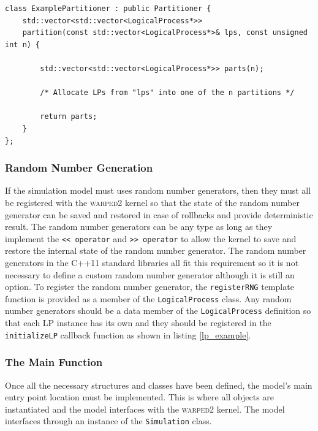 \documentclass[11pt]{book}
\begin{document}
\begin{lstlisting}[caption=Example \textsc{warped2} Partitioner Definition, label=partitioner_example, float]
class ExamplePartitioner : public Partitioner {
    std::vector<std::vector<LogicalProcess*>>
    partition(const std::vector<LogicalProcess*>& lps, const unsigned int n) {

        std::vector<std::vector<LogicalProcess*>> parts(n);
        
        /* Allocate LPs from "lps" into one of the n partitions */

        return parts;
    }
};
\end{lstlisting}

\subsubsection{Random Number Generation}

If the simulation model must uses random number generators, then they must all be registered with
the \textsc{warped2} kernel so that the state of the random number generator can be saved and
restored in case of rollbacks and provide deterministic result.  The random number generators can be
any type as long as they implement the \texttt{<< operator} and \texttt{>> operator} to allow the
kernel to save and restore the internal state of the random number generator.  The random number
generators in the C++11 standard libraries \cite{c++11-rng} all fit this requirement so it is not
necessary to define a custom random number generator although it is still an option.  To register
the random number generator, the \texttt{registerRNG} template function is provided as a member of
the \texttt{LogicalProcess} class.  Any random number generators should be a data member of the
\texttt{LogicalProcess} definition so that each LP instance has its own and they should be
registered in the \texttt{initializeLP} callback function as shown in listing \ref{lp_example}.

\subsubsection{The Main Function}

Once all the necessary structures and classes have been defined, the model's main entry point
location must be implemented.  This is where all objects are instantiated and the model interfaces
with the \textsc{warped2} kernel. The model interfaces through an instance of the
\texttt{Simulation} class.
\end{document}
